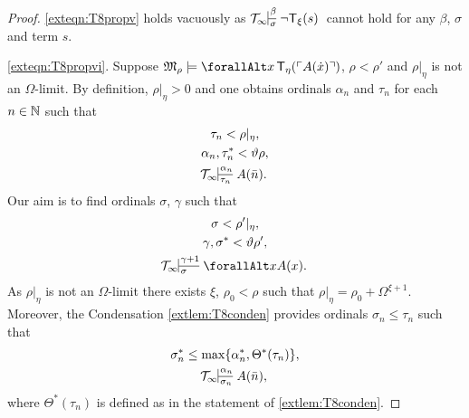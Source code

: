\documentclass[UKenglish,cleveref,DIV=12]{scrartcl}
\let\forall\forallAlt
\theoremstyle{definition}
\theoremstyle{definition}
\begin{document}
\begin{proof}
\ref{exteqn:T8propv} holds vacuously as $\Tinfty\prov\beta\sigma{\lnot\T_\xi(s)}$ cannot hold for any $\beta$, $\sigma$ and term $s$.

\ref{exteqn:T8propvi}. Suppose $\mathfrak M_\rho\models \forall x\, \T_\eta(\gn{A(\dot x)})$, $\rho<\rho'$ and $\rho|_\eta$ is not an $\Omega$-limit. By definition, $\rho|_\eta>0$ and one obtains ordinals $\alpha_n$ and $\tau_n$ for each $n\in \mathbb N$ such that
\begin{gather*}
  \tau_n<\rho|_\eta,\\
  \alpha_n,\tau_n^* <\vartheta\rho,\\
  \Tinfty\prov{\alpha_n}{\tau_n}{A(\bar n).}
\end{gather*}
Our aim is to find ordinals $\sigma$, $\gamma$ such that
\begin{gather}
  \sigma<\rho'|_\eta,\label{exteqn:T8Mprop4}\\
  \gamma,\sigma^*<\vartheta\rho',\label{exteqn:T8Mprop5}\\
  \Tinfty\prov{\gamma+1}\sigma{\forall xA(x).}\label{exteqn:T8Mprop6}
\end{gather}
%
%
As $\rho|_\eta$ is not an $\Omega$-limit there exists $\xi$, $\rho_0<\rho$ such
that $\rho|_\eta=\rho_0+\Omega^{\xi+1}$. Moreover, the Condensation \cref{extlem:T8conden} provides ordinals
$\sigma_n\le\tau_n$ such that
\begin{gather}\label{exteqn:T8Mprop3}
  \sigma_n^*\le\max\{\alpha_n^*,\Theta^*(\tau_n)\},\\
  \Tinfty\prov{\alpha_n}{\sigma_n}{A(\bar n),}\label{exteqn:T8Mprop2}
\end{gather}
where $\Theta^*(\tau_n)$ is defined as in the statement of \cref{extlem:T8conden}.

\end{proof}
\end{document}
